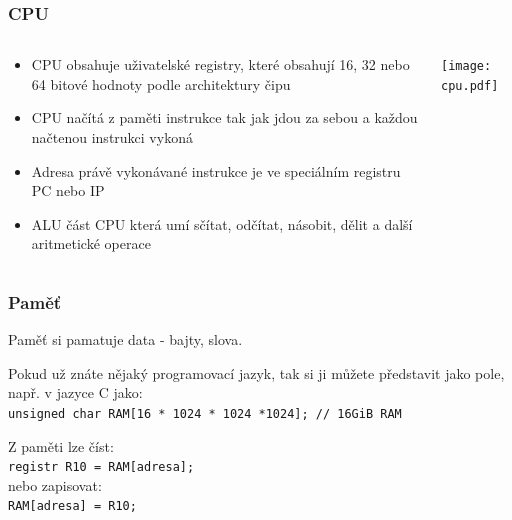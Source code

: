 \documentclass{beamer}
\begin{document}
\begin{frame}
\frametitle{CPU}
\begin{columns}
\begin{column}{0.5\textwidth}
\begin{itemize}
\item CPU obsahuje uživatelské registry, které obsahují 16, 32 nebo 64 bitové hodnoty podle architektury čipu
\item CPU načítá z paměti instrukce tak jak jdou za sebou a každou načtenou instrukci vykoná
\item Adresa právě vykonávané instrukce je ve speciálním registru PC nebo IP
\item ALU část CPU která umí sčítat, odčítat, násobit, dělit a další aritmetické operace
\end{itemize}
\end{column}
\begin{column}{0.5\textwidth}  
\begin{center}
   \texttt{[image: cpu.pdf]}
\end{center}
\end{column}
\end{columns}

\end{frame}



\begin{frame}
\frametitle{Paměť}

Paměť si pamatuje data - bajty, slova.

Pokud už znáte nějaký programovací jazyk, tak si ji můžete představit jako pole, např. v jazyce C jako:\\
\texttt{unsigned char RAM[16 * 1024 * 1024 *1024]; // 16GiB RAM}

\bigskip
Z paměti lze číst:\\
\texttt{registr R10 = RAM[adresa];}\\
nebo zapisovat:\\
\texttt{RAM[adresa] = R10;}

\end{frame}
\end{document}
